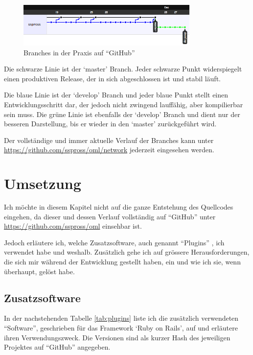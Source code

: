 \begin{figure}[ht]
    \begin{center}
        \includegraphics[width=0.8\textwidth,angle=0]{./bilder/network_01.png}
        \caption{Branches in der Praxis auf ``GitHub''}
        \label{network_01}
    \end{center}
\end{figure}

Die schwarze Linie ist der `master' Branch. Jeder schwarze Punkt widerspiegelt
einen produktiven Release, der in sich abgeschlossen ist und stabil läuft.

Die blaue Linie ist der `develop' Branch und jeder blaue Punkt stellt einen
Entwicklungsschritt dar, der jedoch nicht zwingend lauffähig, aber kompilierbar 
sein muss. Die grüne Linie ist ebenfalls der `develop' Branch und dient nur
der besseren Darstellung, bis er wieder in den `master' zurückgeführt wird.

Der vollständige und immer aktuelle Verlauf der Branches kann unter 
\url{https://github.com/sspross/oml/network} jederzeit eingesehen werden.

\section{Umsetzung}
Ich möchte in diesem Kapitel nicht auf die ganze Entstehung des Quellcodes 
eingehen, da dieser und dessen Verlauf vollständig auf ``GitHub'' unter
\url{https://github.com/sspross/oml} einsehbar ist.

Jedoch erläutere ich, welche Zusatzsoftware, auch genannt ``Plugins'' \cite{plugin}, ich 
verwendet habe und weshalb. Zusätzlich gehe ich auf grössere Herausforderungen,
die sich mir während der Entwicklung gestellt haben, ein und wie ich sie, wenn
überhaupt, gelöst habe.

\subsection{Zusatzsoftware}
In der nachstehenden Tabelle \ref{tab:plugins} liste ich die zusätzlich verwendeten
``Software'', geschrieben für das Framework `Ruby on Rails', auf und erläutere
ihren Verwendungszweck. Die Versionen sind als kurzer Hash \cite{hash} des
jeweiligen Projektes auf ``GitHub'' angegeben.


